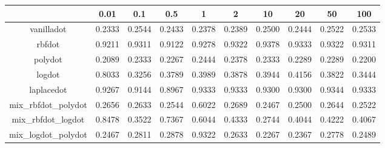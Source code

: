 \begin{table}[ht]
\centering
\begin{tabular}{cccccccccc}
  \hline
 & 0.01 & 0.1 & 0.5 & 1 & 2 & 10 & 20 & 50 & 100 \\ 
  \hline
vanilladot & 0.2333 & 0.2544 & 0.2433 & 0.2378 & 0.2389 & 0.2500 & 0.2444 & 0.2522 & 0.2533 \\ 
  rbfdot & 0.9211 & 0.9311 & 0.9122 & 0.9278 & 0.9322 & 0.9378 & 0.9333 & 0.9322 & 0.9311 \\ 
  polydot & 0.2089 & 0.2333 & 0.2267 & 0.2444 & 0.2378 & 0.2333 & 0.2289 & 0.2289 & 0.2200 \\ 
  logdot & 0.8033 & 0.3256 & 0.3789 & 0.3989 & 0.3878 & 0.3944 & 0.4156 & 0.3822 & 0.3444 \\ 
  laplacedot & 0.9267 & 0.9144 & 0.8967 & 0.9333 & 0.9333 & 0.9300 & 0.9300 & 0.9344 & 0.9333 \\ 
  mix\_rbfdot\_polydot & 0.2656 & 0.2633 & 0.2544 & 0.6022 & 0.2689 & 0.2467 & 0.2500 & 0.2644 & 0.2522 \\ 
  mix\_rbfdot\_logdot & 0.8478 & 0.3522 & 0.7367 & 0.6044 & 0.4333 & 0.2744 & 0.4044 & 0.4222 & 0.4067 \\ 
  mix\_logdot\_polydot & 0.2467 & 0.2811 & 0.2878 & 0.9322 & 0.2633 & 0.2267 & 0.2367 & 0.2778 & 0.2489 \\ 
   \hline
\end{tabular}
\end{table}
